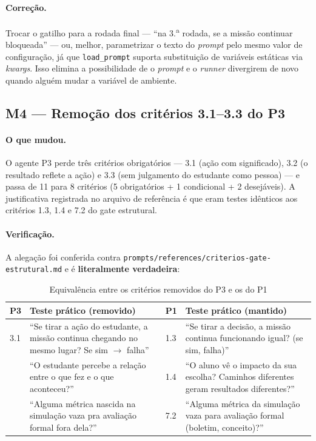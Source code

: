 \documentclass[11pt,a4paper]{article}
\newcommand{\cod}[1]{\texttt{\small #1}}
\begin{document}
\paragraph{Correção.} Trocar o gatilho para a rodada final --- ``na 3.\textsuperscript{a} rodada, se a missão
continuar bloqueada'' --- ou, melhor, parametrizar o texto do \textit{prompt} pelo mesmo valor de
configuração, já que \cod{load\_prompt} suporta substituição de variáveis estáticas via \textit{kwargs}.
Isso elimina a possibilidade de o \textit{prompt} e o \textit{runner} divergirem de novo quando alguém
mudar a variável de ambiente.

\subsection{M4 --- Remoção dos critérios 3.1--3.3 do P3}
\label{sec:m4}

\paragraph{O que mudou.} O agente P3 perde três critérios obrigatórios --- 3.1 (ação com significado),
3.2 (o resultado reflete a ação) e 3.3 (sem julgamento do estudante como pessoa) --- e passa de 11 para
8 critérios (5 obrigatórios + 1 condicional + 2 desejáveis). A justificativa registrada no arquivo de
referência é que eram testes idênticos aos critérios 1.3, 1.4 e 7.2 do gate estrutural.

\paragraph{Verificação.} A alegação foi conferida contra \cod{prompts/references/criterios-gate-estrutural.md}
e é \textbf{literalmente verdadeira}:

\begin{longtable}{p{1.1cm}p{6.0cm}p{1.1cm}p{6.0cm}}
\caption{Equivalência entre os critérios removidos do P3 e os do P1}\\
\toprule
\textbf{P3} & \textbf{Teste prático (removido)} & \textbf{P1} & \textbf{Teste prático (mantido)} \\
\midrule
\endfirsthead
3.1 & ``Se tirar a ação do estudante, a missão continua chegando no mesmo lugar? Se sim $\rightarrow$ falha'' & 1.3 & ``Se tirar a decisão, a missão continua funcionando igual? (se sim, falha)'' \\
\addlinespace
3.2 & ``O estudante percebe a relação entre o que fez e o que aconteceu?'' & 1.4 & ``O aluno vê o impacto da sua escolha? Caminhos diferentes geram resultados diferentes?'' \\
\addlinespace
3.3 & ``Alguma métrica nascida na simulação vaza pra avaliação formal fora dela?'' & 7.2 & ``Alguma métrica da simulação vaza para avaliação formal (boletim, conceito)?'' \\
\bottomrule
\end{longtable}
\end{document}
